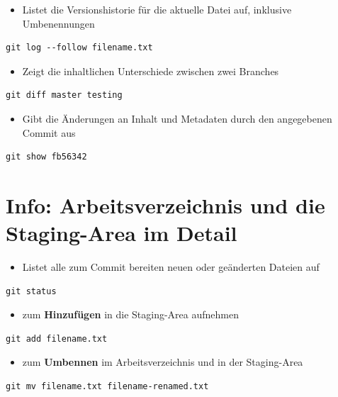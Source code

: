 \documentclass[11pt]{article}
\begin{document}
\begin{itemize}
\item Listet die Versionshistorie für die aktuelle Datei auf, inklusive Umbenennungen
\end{itemize}
\begin{verbatim}
git log --follow filename.txt
\end{verbatim}


\begin{itemize}
\item Zeigt die inhaltlichen Unterschiede zwischen zwei Branches
\end{itemize}
\begin{verbatim}
git diff master testing
\end{verbatim}


\begin{itemize}
\item Gibt die Änderungen an Inhalt und Metadaten durch den angegebenen Commit aus
\end{itemize}
\begin{verbatim}
git show fb56342
\end{verbatim}


\section{Info: Arbeitsverzeichnis und die Staging-Area im Detail}
\label{sec:org6e8d91b}

\begin{itemize}
\item Listet alle zum Commit bereiten neuen oder geänderten Dateien auf
\end{itemize}

\begin{verbatim}
git status
\end{verbatim}


\begin{itemize}
\item zum \textbf{Hinzufügen} in die Staging-Area aufnehmen
\end{itemize}
\begin{verbatim}
git add filename.txt
\end{verbatim}

\begin{itemize}
\item zum \textbf{Umbennen} im Arbeitsverzeichnis und in der Staging-Area
\end{itemize}
\begin{verbatim}
git mv filename.txt filename-renamed.txt
\end{verbatim}
\end{document}
